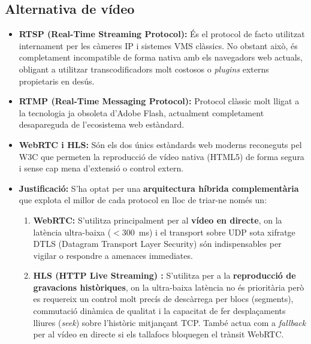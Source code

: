 \subsection{Alternativa de vídeo}
\begin{itemize}
  \item \textbf{RTSP (Real-Time Streaming Protocol):} És el protocol de facto utilitzat internament per les càmeres IP i sistemes VMS clàssics. No obstant això, és completament incompatible de forma nativa amb els navegadors web actuals, obligant a utilitzar transcodificadors molt costosos o \textit{plugins} externs propietaris en desús.
  \item \textbf{RTMP (Real-Time Messaging Protocol):} Protocol clàssic molt lligat a la tecnologia ja obsoleta d'Adobe Flash, actualment completament desapareguda de l'ecosistema web estàndard.
  \item \textbf{WebRTC i HLS:} Són els dos únics estàndards web moderns reconeguts pel W3C que permeten la reproducció de vídeo nativa (HTML5) de forma segura i sense cap mena d'extensió o control extern.
  \item \textbf{Justificació:} S'ha optat per una \textbf{arquitectura híbrida complementària} que explota el millor de cada protocol en lloc de triar-ne només un:
        \begin{enumerate}
          \item \textbf{WebRTC:} S'utilitza principalment per al \textbf{vídeo en directe}, on la latència ultra-baixa ($<300$~ms) i el transport sobre UDP sota xifratge DTLS (Datagram Transport Layer Security) són indispensables per vigilar o respondre a amenaces immediates.
          \item \textbf{HLS (HTTP Live Streaming) \cite{hls_apple}:} S'utilitza per a la \textbf{reproducció de gravacions històriques}, on la ultra-baixa latència no és prioritària però es requereix un control molt precís de descàrrega per blocs (segments), commutació dinàmica de qualitat i la capacitat de fer desplaçaments lliures (\textit{seek}) sobre l'històric mitjançant TCP. També actua com a \textit{fallback} per al vídeo en directe si els tallafocs bloquegen el trànsit WebRTC.
        \end{enumerate}
\end{itemize}

